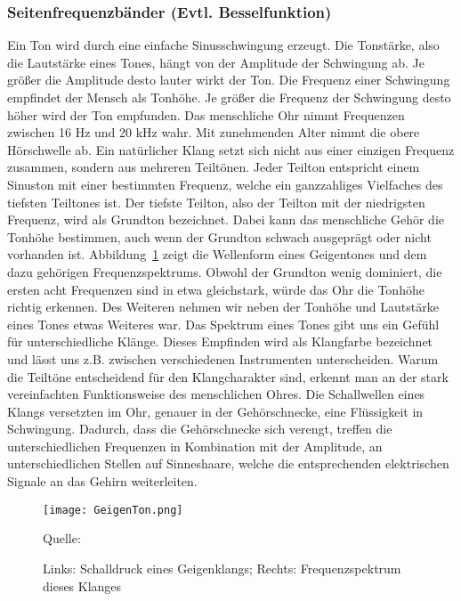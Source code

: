 \subsubsection{Seitenfrequenzbänder (Evtl. Besselfunktion)}
\label{bulli:ohrToeneUndFrequenzen}
Ein Ton wird durch eine einfache Sinusschwingung erzeugt. Die Tonstärke, also die Lautstärke eines Tones, hängt von der Amplitude der Schwingung ab. Je größer die Amplitude desto lauter wirkt der Ton. Die Frequenz einer Schwingung empfindet der Mensch als Tonhöhe. Je größer die Frequenz der Schwingung desto höher wird der Ton empfunden. 
Das menschliche Ohr nimmt Frequenzen zwischen 16 Hz und 20 kHz wahr. Mit zunehmenden Alter nimmt die obere Hörschwelle ab. \cite[S. 199]{borucki}
Ein natürlicher Klang setzt sich nicht aus einer einzigen Frequenz zusammen, sondern aus mehreren Teiltönen. Jeder Teilton entspricht einem Sinuston mit einer bestimmten Frequenz, welche ein ganzzahliges Vielfaches des tiefsten Teiltones ist. Der tiefste Teilton, also der Teilton mit der niedrigsten Frequenz, wird als Grundton bezeichnet. \cite[S. 87]{borucki} 
Dabei kann das menschliche Gehör die Tonhöhe bestimmen, auch wenn der Grundton schwach ausgeprägt oder nicht vorhanden ist. \cite[S. 4]{zwicker} Abbildung~\ref{fig:geige} zeigt die Wellenform eines Geigentones und dem dazu gehörigen Frequenzspektrums. Obwohl der Grundton wenig dominiert, die ersten acht Frequenzen sind in etwa gleichstark, würde das Ohr die Tonhöhe richtig erkennen. Des Weiteren nehmen wir neben der Tonhöhe und Lautstärke eines Tones etwas Weiteres war. Das Spektrum eines Tones gibt uns ein Gefühl für unterschiedliche Klänge. Dieses Empfinden wird als Klangfarbe bezeichnet und lässt uns z.B. zwischen verschiedenen Instrumenten unterscheiden. \cite[S. 5]{zwicker} \cite[S. 226]{raichel}
Warum die Teiltöne entscheidend für den Klangcharakter sind, erkennt man an der stark vereinfachten Funktionsweise des menschlichen Ohres. Die Schallwellen eines Klangs versetzten im Ohr, genauer in der Gehörschnecke, eine Flüssigkeit in Schwingung. Dadurch, dass die Gehörschnecke sich verengt, treffen die unterschiedlichen Frequenzen in Kombination mit der Amplitude, an unterschiedlichen Stellen auf Sinneshaare, welche die entsprechenden elektrischen Signale an das Gehirn weiterleiten. \cite[S. 87 f.]{zwicker}

\begin{figure} [ht]
\centering
  \texttt{[image: GeigenTon.png]}
\caption{Links: Schalldruck eines Geigenklangs; Rechts: Frequenzspektrum dieses Klanges}
\label{fig:geige}
Quelle: \cite[S. 4]{zwicker}
\end{figure}
\FloatBarrier

